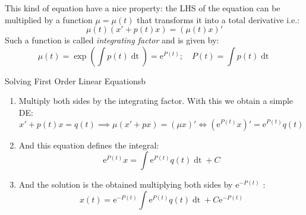 \documentclass[../ode.tex]{subfiles}
\begin{document}
    This kind of equation have a nice property: the LHS of the equation can be multiplied by a function $\mu = \mu(t)$ that
    transforms it into a total derivative i.e.:
    \begin{equation*}
        \mu(t)(x' + p(t)x) = (\mu(t)x)'     
    \end{equation*}
    Such a function is called \emph{integrating factor} and is given by:
    \begin{equation*}
        \mu(t) = \exp\left(\int p(t) \mathop{\mathrm{d}t}\right) = \mathrm{e}^{P(t)};\quad P(t) = \int p(t) \mathop{\mathrm{d}t}
    \end{equation*}

    \begin{prop}{Solving First Order Linear Equations}{b}
        \begin{enumerate}
            \item Multiply both sides by the integrating factor. With this we obtain a simple DE:
                \begin{equation*}
                    x' + p(t)x = q(t) \implies  \mu(x' + px) = (\mu x)' \iff(\mathrm{e}^{P(t)} x)' = \mathrm{e}^{P(t)}q(t)
                \end{equation*}
            \item And this equation defines the integral:
                \begin{equation*}
                    \mathrm{e}^{P(t)} x = \int \mathrm{e}^{P(t)} q(t) \mathop{\mathrm{d}t} + C
                \end{equation*}
                
            \item And the solution is the obtained multiplying both sides by $\mathrm{e}^{-P(t)} $ :
                \begin{equation*}
                    \boxed{x(t) = \mathrm{e}^{-P(t)} \int \mathrm{e}^{P(t)} q(t) \mathop{\mathrm{d}t} + C \mathrm{e}^{-P(t)}}
                \end{equation*}
        \end{enumerate}
    \end{prop}
    
\end{document}
